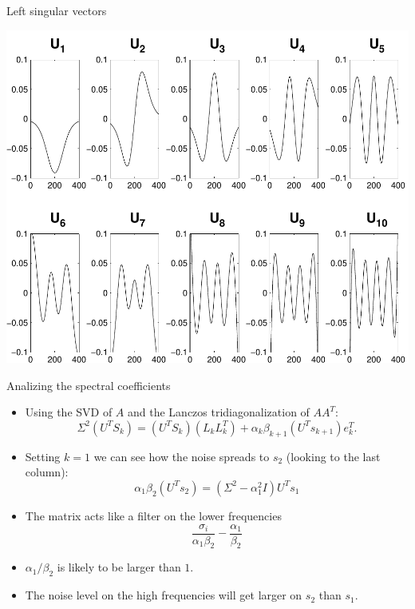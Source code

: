 \documentclass{beamer}
\begin{document}
\begin{frame}{Left singular vectors}
  \begin{center}
    \includegraphics[width=0.55\linewidth]{figures/run1/sing_vecs}
  \end{center}
\end{frame}

\begin{frame}{Analizing the spectral coefficients}
  \begin{itemize}
    \item Using the SVD of $A$ and the Lanczos tridiagonalization of $AA^{T}$:
      \begin{equation*}
	\Sigma^{2}(U^{T}S_{k}) = (U^{T}S_{k})(L_{k}L_{k}^{T}) + 
	\alpha_{k}\beta_{k+1}(U^{T}s_{k+1})e_{k}^{T}.
      \end{equation*}

    \item Setting $k=1$ we can see how the noise spreads to $s_{2}$ (looking to
      the last column):
      \begin{equation*}
	\alpha_{1}\beta_{2}(U^{T}s_{2}) = (\Sigma^{2} - 
	\alpha_{1}^{2}I)U^{T}s_{1}
      \end{equation*}
    
    \item The matrix acts like a filter on the lower frequencies
      \begin{equation*}
	\frac{\sigma_{i}}{\alpha_{1}\beta_{2}} - \frac{\alpha_{1}}{\beta_{2}}
      \end{equation*}
    
    \item $\alpha_{1}/\beta_{2}$ is likely to be larger than $1$.
    \item The noise level on the high frequencies will get larger on $s_{2}$
      than $s_{1}$.
  \end{itemize}
\end{frame}
\end{document}
